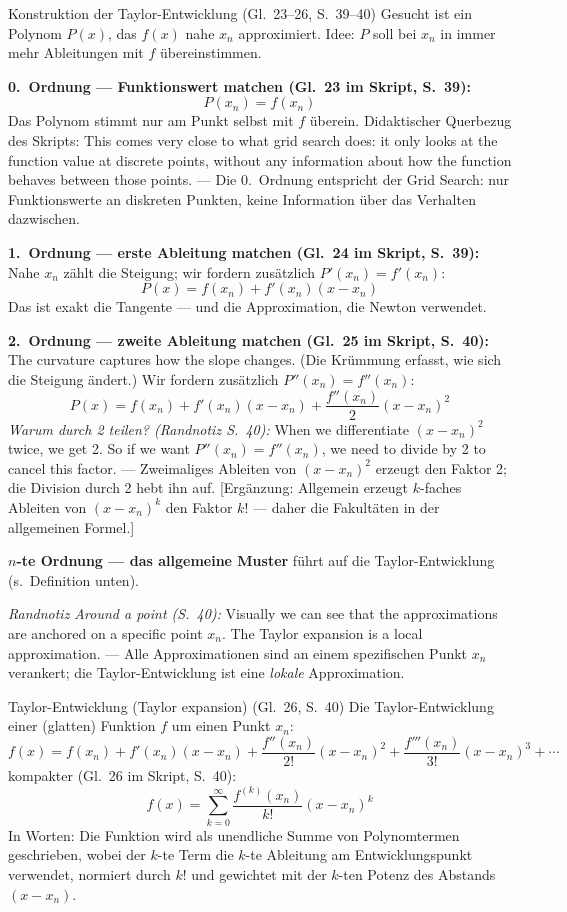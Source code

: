 \begin{satzbox}{Konstruktion der Taylor-Entwicklung (Gl.~23--26, S.~39--40)}
Gesucht ist ein Polynom $P(x)$, das $f(x)$ nahe $x_n$ approximiert. Idee: $P$ soll bei $x_n$ in immer mehr Ableitungen mit $f$ übereinstimmen.

\textbf{0.~Ordnung — Funktionswert matchen (Gl.~23 im Skript, S.~39):}
\[ P(x_n) = f(x_n) \tag{Gl.~23} \]
Das Polynom stimmt nur am Punkt selbst mit $f$ überein. Didaktischer Querbezug des Skripts: \glqq This comes very close to what grid search does: it only looks at the function value at discrete points, without any information about how the function behaves between those points.\grqq{} — Die 0.~Ordnung entspricht der Grid Search: nur Funktionswerte an diskreten Punkten, keine Information über das Verhalten dazwischen.

\textbf{1.~Ordnung — erste Ableitung matchen (Gl.~24 im Skript, S.~39):} Nahe $x_n$ zählt die Steigung; wir fordern zusätzlich $P'(x_n) = f'(x_n)$:
\[ P(x) = f(x_n) + f'(x_n)(x - x_n) \tag{Gl.~24} \]
Das ist exakt die Tangente — und die Approximation, die Newton verwendet.

\textbf{2.~Ordnung — zweite Ableitung matchen (Gl.~25 im Skript, S.~40):} \glqq The curvature captures how the slope changes.\grqq{} (Die Krümmung erfasst, wie sich die Steigung ändert.) Wir fordern zusätzlich $P''(x_n) = f''(x_n)$:
\[ P(x) = f(x_n) + f'(x_n)(x - x_n) + \frac{f''(x_n)}{2}(x - x_n)^2 \tag{Gl.~25} \]
\emph{Warum durch 2 teilen? (Randnotiz S.~40):} \glqq When we differentiate $(x - x_n)^2$ twice, we get 2. So if we want $P''(x_n) = f''(x_n)$, we need to divide by 2 to cancel this factor.\grqq{} — Zweimaliges Ableiten von $(x-x_n)^2$ erzeugt den Faktor 2; die Division durch 2 hebt ihn auf. [Ergänzung: Allgemein erzeugt $k$-faches Ableiten von $(x-x_n)^k$ den Faktor $k!$ — daher die Fakultäten in der allgemeinen Formel.]

\textbf{$n$-te Ordnung — das allgemeine Muster} führt auf die Taylor-Entwicklung (s.\ Definition unten).

\emph{Randnotiz \glqq Around a point\grqq{} (S.~40):} \glqq Visually we can see that the approximations are anchored on a specific point $x_n$. The Taylor expansion is a local approximation.\grqq{} — Alle Approximationen sind an einem spezifischen Punkt $x_n$ verankert; die Taylor-Entwicklung ist eine \emph{lokale} Approximation.
\end{satzbox}

\begin{defbox}{Taylor-Entwicklung (Taylor expansion) (Gl.~26, S.~40)}
Die Taylor-Entwicklung einer (glatten) Funktion $f$ um einen Punkt $x_n$:
\[ f(x) = f(x_n) + f'(x_n)(x - x_n) + \frac{f''(x_n)}{2!}(x - x_n)^2 + \frac{f'''(x_n)}{3!}(x - x_n)^3 + \cdots \]
kompakter (Gl.~26 im Skript, S.~40):
\[ f(x) = \sum_{k=0}^{\infty} \frac{f^{(k)}(x_n)}{k!}(x - x_n)^k \tag{Gl.~26} \]
In Worten: Die Funktion wird als unendliche Summe von Polynomtermen geschrieben, wobei der $k$-te Term die $k$-te Ableitung am Entwicklungspunkt verwendet, normiert durch $k!$ und gewichtet mit der $k$-ten Potenz des Abstands $(x - x_n)$.
\end{defbox}

